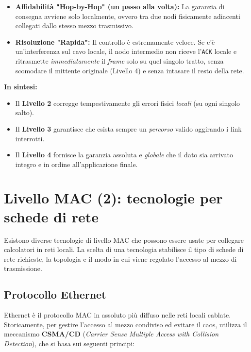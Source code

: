 \documentclass[a4paper,12pt]{report}
\begin{document}
\begin{tcolorbox}[colback=yellow!3!white, colframe=yellow!80!black, title=\textbf{Livello 2 -- MAC/LLC (Controllo Locale)}]
\begin{itemize}[leftmargin=*]
    \item \textbf{Affidabilità "Hop-by-Hop" (un passo alla volta):} La garanzia di consegna avviene solo localmente, ovvero tra due nodi fisicamente adiacenti collegati dallo stesso mezzo trasmissivo.
    \item \textbf{Risoluzione "Rapida":} Il controllo è estremamente veloce. Se c'è un'interferenza sul cavo locale, il nodo intermedio non riceve l'\texttt{ACK} locale e ritrasmette \textit{immediatamente} il \textit{frame} solo su quel singolo tratto, senza scomodare il mittente originale (Livello 4) e senza intasare il resto della rete.
\end{itemize}
\end{tcolorbox}

\bigskip
\noindent
\textbf{In sintesi:}
\begin{itemize}
    \item Il \textbf{Livello 2} corregge tempestivamente gli errori fisici \textit{locali} (su ogni singolo salto).
    \item Il \textbf{Livello 3} garantisce che esista sempre un \textit{percorso} valido aggirando i link interrotti.
    \item Il \textbf{Livello 4} fornisce la garanzia assoluta e \textit{globale} che il dato sia arrivato integro e in ordine all'applicazione finale.
\end{itemize}





\newpage
\section{Livello MAC (2): tecnologie per schede di rete}

Esistono diverse tecnologie di livello MAC che possono essere usate per collegare calcolatori in reti locali. La scelta di una tecnologia stabilisce il tipo di schede di rete richieste, la topologia e il modo in cui viene regolato l'accesso al mezzo di trasmissione.

\subsection{Protocollo Ethernet}

Ethernet è il protocollo MAC in assoluto più diffuso nelle reti locali cablate. Storicamente, per gestire l'accesso al mezzo condiviso ed evitare il caos, utilizza il meccanismo \textbf{CSMA/CD} (\textit{Carrier Sense Multiple Access with Collision Detection}), che si basa sui seguenti principi:
\end{document}
